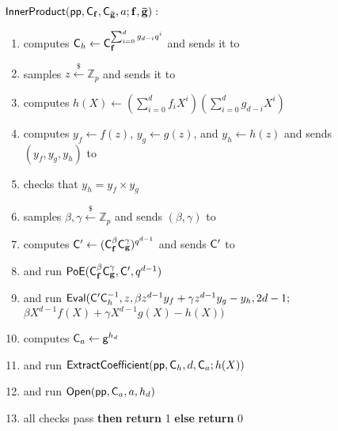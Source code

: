 \documentclass{article}
\theoremstyle{definition}
\begin{document}
\begin{figure}[!htp]
\noindent\begin{mdframed}[userdefinedwidth=\textwidth]
\begin{minipage}{\textwidth}
	\begin{flushleft}
	$\textsf{{InnerProduct}}(\textsf{pp}, \mathsf{C}_\mathbf{f}, \mathsf{C}_\mathbf{\bar{g}}, a; \mathbf{f}, \mathbf{\bar{g}}):$ 
		\begin{enumerate}[nolistsep]
		    \item \prover computes $\mathsf{C}_h \gets \mathsf{C}_\mathbf{f}^{\sum_{i=0}^{d} g_{d-i} q^i}$ and sends it to \verifier
		    \item \verifier samples $z \xleftarrow{\$} \mathbb{Z}_p$ and sends it to \prover
		    \item \prover computes $h(X) \gets \left(\sum_{i=0}^d f_i X^i\right) \left(\sum_{i=0}^d g_{d-i} X^i\right)$
		    \item \prover computes $y_f \gets f(z)$, $y_g \gets g(z)$, and $y_h \gets h(z)$ and sends $(y_f, y_g, y_h)$ to \verifier
		    \item \verifier checks that $y_h = y_f \times y_g$
		    \item \verifier samples $\beta, \gamma \xleftarrow{\$} \mathbb{Z}_p$ and sends $(\beta, \gamma)$ to \prover
		    \item \prover computes $\mathsf{C}' \gets (\mathsf{C}_\mathbf{f}^\beta \mathsf{C}_\mathbf{g}^\gamma)^{q^{d-1}}$ and sends $\mathsf{C}'$ to \verifier
		    \item \prover and \verifier run $\textsf{{PoE}}(\mathsf{C}_\mathbf{f}^\beta \mathsf{C}_\mathbf{g}^\gamma, \mathsf{C}', q^{d-1})$
		    \item \prover and \verifier run $\textsf{{Eval}}(\mathsf{C}'\mathsf{C}_h^{-1}, z, {\beta{} z^{d-1} y_f + \gamma{} z^{d-1} y_g - y_h} , {2d-1} ;$ ${\beta{} X^{d-1} f(X) + \gamma{} X^{d-1} g(X) - h(X)})$
		    \item \prover computes $\mathsf{C}_a \leftarrow \mathsf{g}^{h_d}$
		    \item \prover and \verifier run $\textsf{{ExtractCoefficient}}(\textsf{pp}, \mathsf{C}_h, d, \mathsf{C}_a; h(X))$
		    \item \prover and \verifier run $\textsf{{Open}}(\textsf{pp}, \mathsf{C}_a, a, h_d)$
		    \item \pcif{}all checks pass \textbf{then} \textbf{return} 1 \textbf{else} \textbf{return} 0
		\end{enumerate}
	\end{flushleft}
\end{minipage}
\end{mdframed}
\end{figure}
\end{document}
